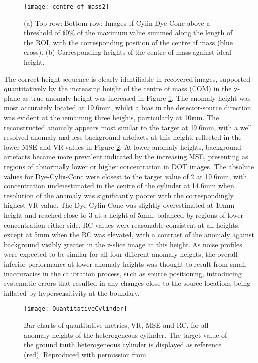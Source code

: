 \documentclass[twoside]{bhamthesis}
\theoremstyle{definition}
\begin{document}
\begin{figure}[!ht]
\centering
  \texttt{[image: centre\_of\_mass2]}
  \caption{(a) Top row: Bottom row: Images of Cylin-Dye-Conc above a threshold of 60\% of the maximum value summed along the length of the ROI, with the corresponding position of the centre of mass (blue cross). (b) Corresponding heights of the centre of mass against ideal height.}
    \label{fig:centre_of_mass2}
\end{figure}

The correct height sequence is clearly identifiable in recovered images, supported quantitatively by the increasing height of the centre of mass (COM) in the y-plane as true anomaly height was increased in Figure \ref{fig:centre_of_mass2}. The anomaly height was most accurately located at 19.6mm, whilst a bias in the detector-source direction was evident at the remaining three heights, particularly at 10mm. The reconstructed anomaly appears most similar to the target at 19.6mm, with a well resolved anomaly and less background artefacts at this height, reflected in the lower MSE and VR values in Figure \ref{fig:QuantitativeCylinder}. At lower anomaly heights, background artefacts became more prevalent indicated by the increasing MSE, presenting as regions of abnormally lower or higher concentration in DOT images. The absolute values for Dye-Cylin-Conc were closest to the target value of 2 at 19.6mm, with concentration underestimated in the centre of the cylinder at 14.6mm when resolution of the anomaly was significantly poorer with the correspondingly highest VR value. The Dye-Cylin-Conc was slightly overestimated at 10mm height and reached close to 3 at a height of 5mm, balanced by regions of lower concentration either side. RC values were reasonable consistent at all heights, except at 5mm when the RC was elevated, with a contrast of the anomaly against background visibly greater in the z-slice image at this height. As noise profiles were expected to be similar for all four different anomaly heights, the overall inferior performance at lower anomaly heights was thought to result from small inaccuracies in the calibration process, such as source positioning, introducing systematic errors that resulted in any changes close to the source locations being inflated by hypersensitivity at the boundary.

\begin{figure}[!ht]
\centering
  \texttt{[image: QuantitativeCylinder]}
  \caption{Bar charts of quantitative metrics, VR, MSE and RC, for all anomaly heights of the heterogeneous cylinder. The target value of the ground truth heterogeneous cylinder is displayed as reference (red). Reproduced with permission from \cite{lu20181}}
    \label{fig:QuantitativeCylinder}
\end{figure}
\end{document}
